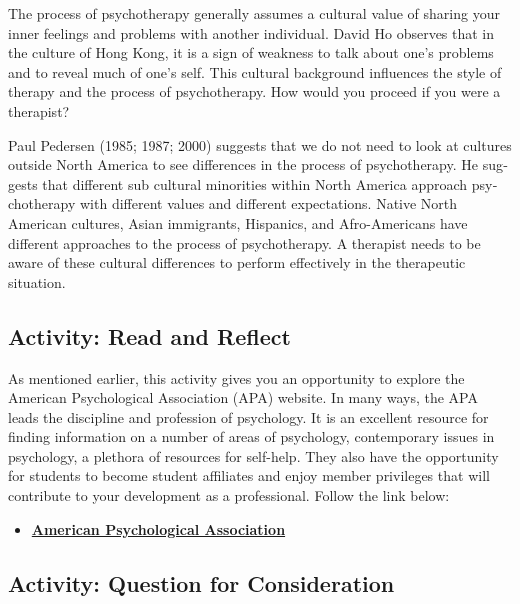 \documentclass[
]{book}
\providecommand{\tightlist}{%
  \setlength{\itemsep}{0pt}\setlength{\parskip}{0pt}}
\begin{document}
The process of psychotherapy generally assumes a cultural value of sharing your inner feelings and problems with another individual. David Ho observes that in the culture of Hong Kong, it is a sign of weakness to talk about one's problems and to reveal much of one's self. This cultural background influences the style of therapy and the process of psychotherapy. How would you proceed if you were a therapist?

Paul Pedersen (1985; 1987; 2000) suggests that we do not need to look at cultures outside North America to see differences in the process of psychotherapy. He sug­gests that different sub cultural minorities within North America approach psy­chotherapy with different values and different expectations. Native North American cultures, Asian immigrants, Hispanics, and Afro-Americans have different approaches to the pro­cess of psychotherapy. A therapist needs to be aware of these cultural differ­ences to perform effectively in the therapeutic situation.

\hypertarget{activity-read-and-reflect-21}{%
\subsection*{Activity: Read and Reflect}\label{activity-read-and-reflect-21}}

\begin{reflect}
As mentioned earlier, this activity gives you an opportunity to explore the American Psychological Association (APA) website. In many ways, the APA leads the discipline and profession of psychology. It is an excellent resource for finding information on a number of areas of psychology, contemporary issues in psychology, a plethora of resources for self-help. They also have the opportunity for students to become student affiliates and enjoy member privileges that will contribute to your development as a professional. Follow the link below:

\begin{itemize}
\tightlist
\item
  \href{https://www.apa.org/}{\textbf{American Psychological Association}}
\end{itemize}
\end{reflect}

\hypertarget{activity-question-for-consideration-8}{%
\subsection*{Activity: Question for Consideration}\label{activity-question-for-consideration-8}}
\end{document}
